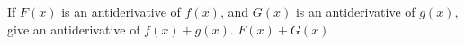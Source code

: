 {If $F(x)$ is an antiderivative of $f(x)$, and $G(x)$ is an antiderivative of $g(x)$, give an antiderivative of $f(x)+g(x)$.
}
{$F(x)+G(x)$
}

